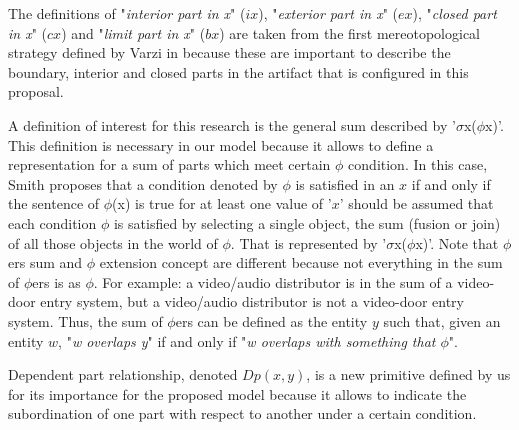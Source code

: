 \documentclass[runningheads,a4paper]{llncs}
\begin{document}
The definitions of "\emph{interior part in x}" ($ix$), "\emph{exterior part in x}" ($ex$), "\emph{closed part in x}" ($cx$) and "\emph{limit part in x}" ($bx$) are taken from the first mereotopological strategy defined by Varzi in \cite{varzi1996parts} because these are important to describe the boundary, interior and closed parts in the artifact that is configured in this proposal.

A definition of interest for this research is the general sum described by '$\sigma$x($\phi$x)'. This definition is necessary in our model because it allows to define a representation for a sum of parts which meet certain $\phi$ condition. In this case, Smith\cite{smith1996mereotopology} proposes that a condition denoted by $\phi$ is satisfied in an $x$ if and only if the sentence of $\phi$(x) is true for at least one value of '$x$' should be assumed that each condition $\phi$ is satisfied by selecting a single object, the sum (fusion or join) of all those objects in the world of $\phi$. That is represented by '$\sigma$x($\phi$x)'. Note that $\phi$ers sum and $\phi$ extension concept are different because not everything in the sum of $\phi$ers is as $\phi$. For example: a video/audio distributor is in the sum of a video-door entry system, but a video/audio distributor is not a video-door entry system. Thus, the sum of $\phi$ers can be defined as the entity $y$ such that, given an entity $w$, "\emph{w overlaps y}" if and only if "\emph{w overlaps with something that $\phi$}". 

Dependent part relationship, denoted $Dp(x,y)$, is a new primitive defined by us for its importance for the proposed model because it allows to indicate the subordination of one part with respect to another under a certain condition.
\end{document}
